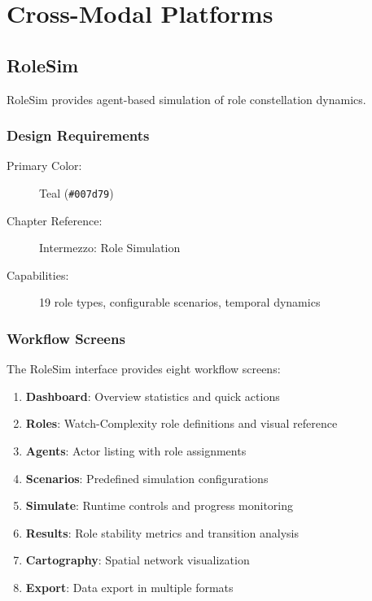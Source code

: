 \section{Cross-Modal Platforms}

\subsection{RoleSim}

RoleSim provides agent-based simulation of role constellation dynamics.

\subsubsection{Design Requirements}

\begin{description}
    \item[Primary Color:] Teal (\texttt{\#007d79})
    \item[Chapter Reference:] Intermezzo: Role Simulation
    \item[Capabilities:] 19 role types, configurable scenarios, temporal dynamics
\end{description}

\subsubsection{Workflow Screens}

The RoleSim interface provides eight workflow screens:

\begin{enumerate}
    \item \textbf{Dashboard}: Overview statistics and quick actions
    \item \textbf{Roles}: Watch-Complexity role definitions and visual reference
    \item \textbf{Agents}: Actor listing with role assignments
    \item \textbf{Scenarios}: Predefined simulation configurations
    \item \textbf{Simulate}: Runtime controls and progress monitoring
    \item \textbf{Results}: Role stability metrics and transition analysis
    \item \textbf{Cartography}: Spatial network visualization
    \item \textbf{Export}: Data export in multiple formats
\end{enumerate}

